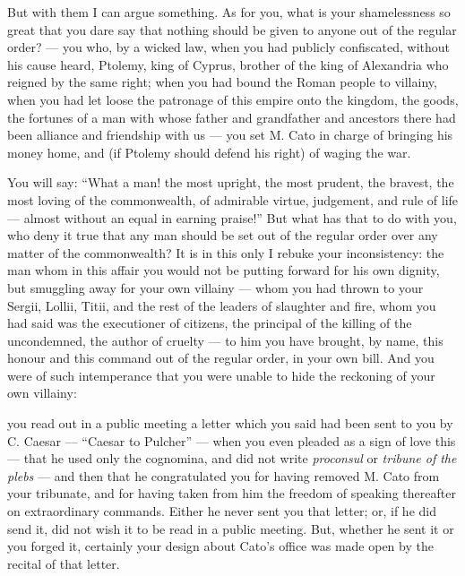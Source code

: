  But with them I can argue something. As for you, what is your shamelessness so great that you dare say that nothing should be given to anyone out of the regular order? --- you who, by a wicked law, when you had publicly confiscated, without his cause heard, Ptolemy, king of Cyprus, brother of the king of Alexandria who reigned by the same right; when you had bound the Roman people to villainy, when you had let loose the patronage of this empire onto the kingdom, the goods, the fortunes of a man with whose father and grandfather and ancestors there had been alliance and friendship with us --- you set M. Cato in charge of bringing his money home, and (if Ptolemy should defend his right) of waging the war.

 You will say: ``What a man! the most upright, the most prudent, the bravest, the most loving of the commonwealth, of admirable virtue, judgement, and rule of life --- almost without an equal in earning praise!'' But what has that to do with you, who deny it true that any man should be set out of the regular order over any matter of the commonwealth? It is in this only I rebuke your inconsistency: the man whom in this affair you would not be putting forward for his own dignity, but smuggling away for your own villainy --- whom you had thrown to your Sergii, Lollii, Titii, and the rest of the leaders of slaughter and fire, whom you had said was the executioner of citizens, the principal of the killing of the uncondemned, the author of cruelty --- to him you have brought, by name, this honour and this command out of the regular order, in your own bill. And you were of such intemperance that you were unable to hide the reckoning of your own villainy:

 you read out in a public meeting a letter which you said had been sent to you by C. Caesar --- ``Caesar to Pulcher'' --- when you even pleaded as a sign of love this --- that he used only the cognomina, and did not write \textit{proconsul} or \textit{tribune of the plebs} --- and then that he congratulated you for having removed M. Cato from your tribunate, and for having taken from him the freedom of speaking thereafter on extraordinary commands. Either he never sent you that letter; or, if he did send it, did not wish it to be read in a public meeting. But, whether he sent it or you forged it, certainly your design about Cato's office was made open by the recital of that letter.

